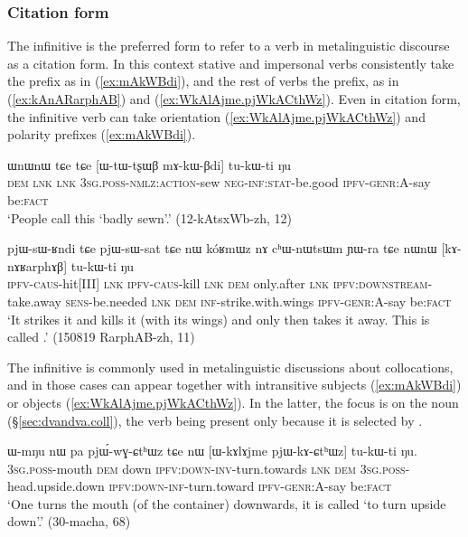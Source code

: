 \subsubsection{Citation form} \label{sec:inf.citation}
The infinitive is the preferred form to refer to a verb in metalinguistic discourse as a citation form. In this context stative and impersonal verbs consistently take the  prefix as in (\ref{ex:mAkWBdi}), and the rest of verbs the  prefix, as in (\ref{ex:kAnARarphAB}) and (\ref{ex:WkAlAjme.pjWkACthWz}). Even in citation form, the infinitive verb can take orientation (\ref{ex:WkAlAjme.pjWkACthWz}) and polarity prefixes (\ref{ex:mAkWBdi}).  

\begin{exe}
\ex  \label{ex:mAkWBdi}
 \gll ɯnɯnɯ tɕe tɕe [ɯ-tɯ-tʂɯβ mɤ-kɯ-βdi] tu-kɯ-ti ŋu \\ 
 \textsc{dem} \textsc{lnk} \textsc{lnk} \textsc{3sg}.\textsc{poss}-\textsc{nmlz}:\textsc{action}-sew \textsc{neg}-\textsc{inf}:\textsc{stat}-be.good  \textsc{ipfv}-\textsc{genr}:A-say be:\textsc{fact}  \\
\glt `People call this `badly sewn'.'  (12-kAtsxWb-zh, 12)
\end{exe}

\begin{exe}
\ex \label{ex:kAnARarphAB}
 \gll  pjɯ-sɯ-ʁndi tɕe pjɯ-sɯ-sat tɕe nɯ kóʁmɯz nɤ cʰɯ-nɯtsɯm ɲɯ-ra tɕe nɯnɯ [kɤ-nɤʁarphɤβ] tu-kɯ-ti ŋu  \\
 \textsc{ipfv}-\textsc{caus}-hit[III]  \textsc{lnk} \textsc{ipfv}-\textsc{caus}-kill \textsc{lnk} \textsc{dem} only.after \textsc{lnk} \textsc{ipfv}:\textsc{downstream}-take.away \textsc{sens}-be.needed \textsc{lnk} \textsc{dem} \textsc{inf}-strike.with.wings \textsc{ipfv}-\textsc{genr}:A-say be:\textsc{fact}  \\
 \glt `It strikes it and kills it (with its wings) and only then takes it away. This is called .' (150819 RarphAB-zh, 11)
\end{exe}


The infinitive is commonly used in metalinguistic discussions about collocations, and in those cases can appear together with intransitive subjects (\ref{ex:mAkWBdi}) or objects (\ref{ex:WkAlAjme.pjWkACthWz}). In the latter, the focus is on the noun  (§\ref{sec:dvandva.coll}), the verb  being present only because it is selected by .

\begin{exe}
\ex \label{ex:WkAlAjme.pjWkACthWz}
 \gll  ɯ-mŋu nɯ pa pjɯ́-wɣ-ɕtʰɯz tɕe nɯ [ɯ-kɤlɤjme pjɯ-kɤ-ɕtʰɯz] tu-kɯ-ti ŋu. \\
\textsc{3sg}.\textsc{poss}-mouth \textsc{dem} down \textsc{ipfv}:\textsc{down}-\textsc{inv}-turn.towards \textsc{lnk} \textsc{dem}  \textsc{3sg}.\textsc{poss}-head.upside.down   \textsc{ipfv}:\textsc{down}-\textsc{inf}-turn.toward \textsc{ipfv}-\textsc{genr}:A-say be:\textsc{fact}  \\
\glt `One turns the mouth (of the container) downwards, it is called `to turn upside down'.' (30-macha, 68)
\end{exe}

